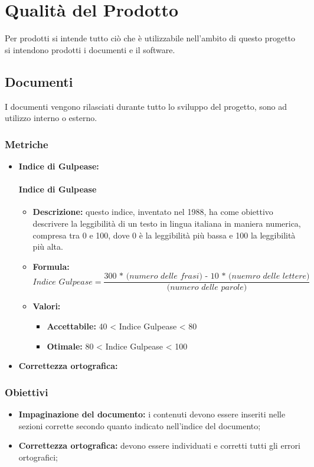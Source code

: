 \section{Qualità del Prodotto}
Per prodotti si intende tutto ciò che è utilizzabile nell'ambito di questo progetto si intendono prodotti i documenti e il software.

\subsection{Documenti}
I documenti vengono rilasciati durante tutto lo sviluppo del progetto, sono ad utilizzo interno o esterno.

\subsubsection{Metriche}
\begin{itemize}
    \item \textbf{Indice di Gulpease:}
    \paragraph{Indice di Gulpease}
\begin{itemize}
\item \textbf{Descrizione:} questo indice, inventato nel 1988, ha come obiettivo descrivere la leggibilità di un testo in lingua italiana in maniera numerica, compresa tra 0 e 100, dove 0 è la leggibilità più bassa e 100 la leggibilità più alta. 
\item \textbf{Formula:} \[\textit{Indice Gulpease} = \frac{\textit{300 * (numero delle frasi) - 10 * (nuemro delle lettere)}}{\textit{(numero delle parole)}}\]
\item \textbf{Valori:}
    \begin{itemize}
        \item \textbf{Accettabile:} 40 < Indice Gulpease < 80
        \item \textbf{Otimale:} 80 < Indice Gulpease < 100
    \end{itemize}
\end{itemize}
    \item \textbf{Correttezza ortografica:}
\end{itemize}

\subsubsection{Obiettivi}
\begin{itemize}
    \item \textbf{Impaginazione del documento:} i contenuti devono essere inseriti nelle sezioni corrette secondo quanto indicato nell'indice del documento;
    \item \textbf{Correttezza ortografica:} devono essere individuati e corretti tutti gli errori ortografici;
\end{itemize}

